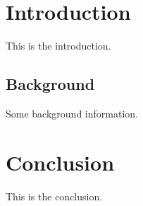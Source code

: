 \documentclass{article}
\begin{document}
\section{Introduction}
This is the introduction.

\subsection{Background}
Some background information.


\section{Conclusion}
This is the conclusion.
\end{document}
